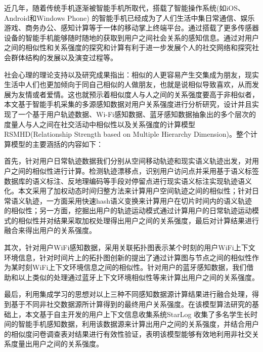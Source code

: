 \begin{cabstract}
近几年，随着传统手机逐渐被智能手机所取代，搭载了智能操作系统(如iOS、Android和Windows Phone) 的智能手机已经成为了人们生活中集日常通信、娱乐游戏、商务办公、感知计算等于一体的移动掌上终端平台。通过搭载了更多传感器设备的智能手机能够随时随地的获取到用户之间社会关系的感知信息。通过对用户之间的相似性和关系强度的探究和计算有利于进一步发展个人的社交网络和探究社会群体结构的发展以及演变过程等。
\par 社会心理的理论支持以及研究成果指出：相似的人更容易产生交集成为朋友，现实生活中人们也更加倾向于同自己相似的人做朋友，也就是说相似导致喜欢，从而发展为友情或者爱情。这也就预示着相似度人与人之间的关系强度要高于非相似者，本文基于智能手机采集的多源感知数据对用户关系强度进行分析研究，设计并且实现了一个基于用户轨迹数据、Wi-Fi感知数据、蓝牙感知数据抽象出的多个层次的度量人与人之间在社交活动中相似性以及关系强度的计算模型RSMHD(Relationship Strength based on Multiple Hierarchy Dimension)。整个计算模型的主要涵括的内容如下：
\par 首先，针对用户日常轨迹数据我们分别从空间移动轨迹和现实语义轨迹出发，对用户之间的相似性进行计算。检测轨迹漂移点，识别用户访问点并采用基于语义标签数据库的语义标注、反地理编码等手段对停留点进行现实语义标注实现轨迹语义化。本文采用了加权动态时间归整方法来计算用户空间轨迹之间的相似性；针对日常语义轨迹，一方面采用快速hash语义变换来计算用户在切片时间内的语义轨迹的相似性；另一方面，挖掘出用户的轨迹运动模式通过计算用户的日常轨迹运动模式的相似性并对结果采取加权处理得出用户之间的关系强度，最后对计算结果进行融合来得出用户的关系强度。

\par 其次，针对用户WiFi感知数据，采用关联拓扑图表示某个时刻的用户WiFi上下文环境信息，针对时间片上的拓扑图创新的提出了通过计算图与节点之间的相似性作为某时刻WiFi上下文环境信息之间的相似性。针对用户的蓝牙感知数据，我们借助和以上类似的处理通过蓝牙上下文环境相似性等来计算出用户之间的关系强度。

\par 最后，利用集成学习的思想对以上三种不同感知数据源计算结果进行融合处理，得到基于不同非社交数据源所计算得到的最终用户关系强度。在该模型算法研究的基础上，本文基于自主开发的用户上下文信息收集系统StarLog 收集了多名学生长时间的智能手机感知数据，利用该数据源来计算出用户之间的关系强度，并结合用户的相似度问卷调查表对结果进行有效性验证，表明该模型能够有效地利用非社交关系度量出用户之间的关系强度。
\end{cabstract}
